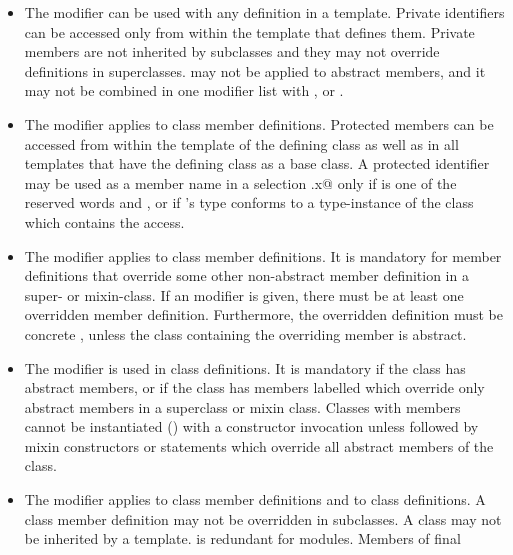 \documentclass[11pt]{report}
\begin{document}
\begin{itemize}
\item
The \verb@private@ modifier can be used with any definition in a
template. Private identifiers can be accessed only from within the template
that defines them.  
Private members are not inherited by subclasses and they
may not override definitions in superclasses.
\verb@private@ may not be applied to abstract members, and it
may not be combined in one modifier list with
\verb@protected@, \verb@final@ or \verb@override@.
\item
The \verb@protected@ modifier applies to class member definitions.
Protected members can be accessed from within the template of the defining
class as well as in all templates that have the defining class as a base class.
A protected identifier \verb@x@ may be used as
a member name in a selection \verb@r.x@ only if \verb@r@ is one of the reserved
words \verb@this@ and
\verb@super@, or if \verb@r@'s type conforms to a type-instance of the class
which contains the access.
\item
The \verb@override@ modifier applies to class member definitions.  It
is mandatory for member definitions that override some other
non-abstract member definition in a super- or mixin-class. If an
\verb@override@ modifier is given, there must be at least one
overridden member definition.  Furthermore, the overridden definition
must be concrete , unless the class containing the
overriding member is abstract.
\item
The \verb@abstract@ modifier is used in class definitions. It is
mandatory if the class has abstract members, or if the class has
members labelled \verb@override@ which override only abstract members
in a superclass or mixin class.  Classes with \verb@abstract@ members
cannot be instantiated () with a constructor
invocation unless followed by mixin constructors or statements which
override all abstract members of the class.
\item
The \verb@final@ modifier applies to class member definitions and to
class definitions. A \verb@final@ class member definition may not be
overridden in subclasses. A \verb@final@ class may not be inherited by
a template. \verb@final@ is redundant for modules.  Members of final

\end{itemize}
\end{document}
